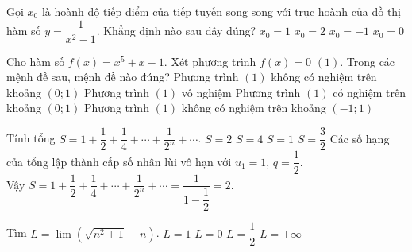 \begin{ex}%
	Gọi $x_0$ là hoành độ tiếp điểm của tiếp tuyến song song với trục hoành của đồ thị hàm số $y=\dfrac{1}{x^2-1}$. Khẳng định nào sau đây đúng?
	\choice
	{$x_0=1$}
	{$x_0=2$}
	{$x_0=-1$}
	{\True $x_0=0$}
\end{ex}

\begin{ex}%
	Cho hàm số $f(x)=x^5+x-1$. Xét phương trình $f(x)=0$ $(1)$. Trong các mệnh đề sau, mệnh đề nào đúng?
	\choice
	{Phương trình $(1)$ không có nghiệm trên khoảng $(0;1)$} 
	{Phương trình $(1)$ vô nghiệm} 
	{\True Phương trình $(1)$ có nghiệm trên khoảng $(0;1)$} 
	{Phương trình $(1)$ không có nghiệm trên khoảng $(-1;1)$} 
\end{ex}

\begin{ex}%
	Tính tổng $S=1+\dfrac{1}{2}+\dfrac{1}{4}+\cdots+\dfrac{1}{2^n}+\cdots$.
	\choice
	{\True $S=2$}
	{$S=4$}
	{$S=1$}
	{$S=\dfrac{3}{2}$}
	\loigiai
	{
		Các số hạng của tổng lập thành cấp số nhân lùi vô hạn với $u_1=1$, $q=\dfrac{1}{2}$.\\
		Vậy $S=1+\dfrac{1}{2}+\dfrac{1}{4}+\cdots+\dfrac{1}{2^n}+\cdots=\dfrac{1}{1-\dfrac{1}{2}}=2$.
	}
\end{ex}

\begin{ex}%
	Tìm $L=\lim\left(\sqrt{n^2+1}-n\right)$.
	\choice
	{$L=1$}
	{\True $L=0$}
	{$L=\dfrac{1}{2}$}
	{$L=+\infty$}
\end{ex}


